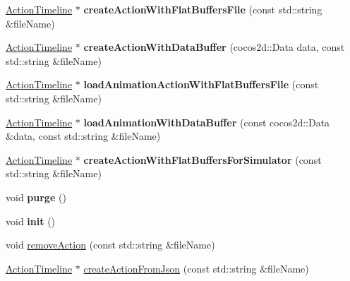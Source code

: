 \begin{DoxyCompactItemize}
\hyperlink{classActionTimeline}{Action\+Timeline} $\ast$ {\bfseries create\+Action\+With\+Flat\+Buffers\+File} (const std\+::string \&file\+Name)
\item 
\mbox{\label{classActionTimelineCache_a0ebd3086be614241e290e2ea22f9a4ba}} 
\hyperlink{classActionTimeline}{Action\+Timeline} $\ast$ {\bfseries create\+Action\+With\+Data\+Buffer} (cocos2d\+::\+Data data, const std\+::string \&file\+Name)
\item 
\mbox{\label{classActionTimelineCache_a6a28002c15bbf17dd31e6f482b763a32}} 
\hyperlink{classActionTimeline}{Action\+Timeline} $\ast$ {\bfseries load\+Animation\+Action\+With\+Flat\+Buffers\+File} (const std\+::string \&file\+Name)
\item 
\mbox{\label{classActionTimelineCache_a91d730e753b7ba9184742d2db6c62c74}} 
\hyperlink{classActionTimeline}{Action\+Timeline} $\ast$ {\bfseries load\+Animation\+With\+Data\+Buffer} (const cocos2d\+::\+Data \&data, const std\+::string \&file\+Name)
\item 
\mbox{\label{classActionTimelineCache_a46b096a66adc4e1fb11d6bd21dcefa08}} 
\hyperlink{classActionTimeline}{Action\+Timeline} $\ast$ {\bfseries create\+Action\+With\+Flat\+Buffers\+For\+Simulator} (const std\+::string \&file\+Name)
\item 
\mbox{\label{classActionTimelineCache_ab3ebdb24012a514be6f0651ef980f556}} 
void {\bfseries purge} ()
\item 
\mbox{\label{classActionTimelineCache_a1d478369c10f7f3bed633bc5e7e97eb4}} 
void {\bfseries init} ()
\item 
void \hyperlink{classActionTimelineCache_ac4308862e347ec5cb1459c29f8b8d012}{remove\+Action} (const std\+::string \&file\+Name)
\item 
\hyperlink{classActionTimeline}{Action\+Timeline} $\ast$ \hyperlink{classActionTimelineCache_a0cc185b113e34b83ff5230e25d115ae8}{create\+Action\+From\+Json} (const std\+::string \&file\+Name)
\item 
\mbox{\label{classActionTimelineCache_ad3d2e6413878dba31df70105a609c3ec}} 

\end{DoxyCompactItemize}
